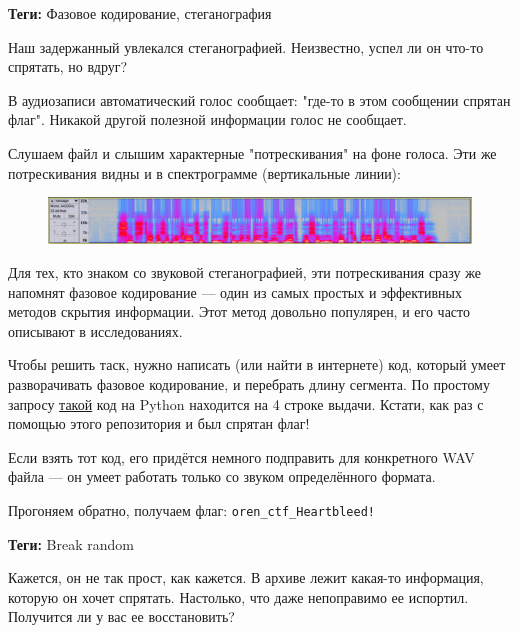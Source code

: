 \documentclass[idxtotoc,hyperref,openany,oneside]{files/forensics} %
\begin{document}
\textbf{Теги:} Фазовое кодирование, стеганография\vspace{\baselineskip}

\begin{tcolorbox}
Наш задержанный увлекался стеганографией. Неизвестно, успел ли он что-то спрятать, но вдруг?
\end{tcolorbox}

В аудиозаписи автоматический голос сообщает: "где-то в этом сообщении спрятан флаг". Никакой другой полезной информации голос не сообщает.

Слушаем файл и слышим характерные "потрескивания" на фоне голоса. Эти же потрескивания видны и в спектрограмме (вертикальные линии):
\begin{figure}[H]
\begin{center}
\includegraphics[width=1.0\linewidth]{files/spectrogram}
\end{center}
\label{fig:spectrogram}
\end{figure}

Для тех, кто знаком со звуковой стеганографией, эти потрескивания сразу же напомнят фазовое кодирование — один из самых простых и эффективных методов скрытия информации. Этот метод довольно популярен, и его часто описывают в исследованиях.

Чтобы решить таск, нужно написать (или найти в интернете) код, который умеет разворачивать фазовое кодирование, и перебрать длину сегмента. По простому запросу \href{https://github.com/Galarius/py-stego-phase}{такой} код на Python находится на 4 строке выдачи. Кстати, как раз с помощью этого репозитория и был спрятан флаг!

Если взять тот код, его придётся немного подправить для конкретного WAV файла — он умеет работать только со звуком определённого формата.

Прогоняем обратно, получаем флаг: \verb|oren_ctf_Heartbleed!|




\textbf{Теги:} Break random\vspace{\baselineskip}

\begin{tcolorbox}
Кажется, он не так прост, как кажется. В архиве лежит какая-то информация, которую он хочет спрятать. Настолько, что даже непоправимо ее испортил. Получится ли у вас ее восстановить?
\end{tcolorbox}
\end{document}
